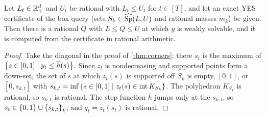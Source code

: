 \begin{proposition}\label{prop:rational-Q}
Let $L_t\in\Rp[d]$ and $U_t$ be rational with $L_t\le U_t$ for $t\in[T]$, and let an exact YES certificate of the box query (sets $S_k\in\wSp(L,U)$ and rational masses $m_k$) be given. Then there is a rational $Q$ with $L\le Q\le U$ at which $y$ is weakly solvable, and it is computed from the certificate in rational arithmetic.
\end{proposition}

\begin{proof}
Take the diagonal in the proof of \cref{thm:corners}; there $s_t$ is the maximum of $\set{s\in[0,1]\mid y_t\le\overline h(s)}$. Since $z_t$ is nondecreasing and supported points form a down-set, the set of $s$ at which $z_t(s)$ is supported off $S_k$ is empty, $[0,1]$, or $[0,s_{k,t}]$ with $s_{k,t}=\inf\set{s\in[0,1]\mid z_t(s)\in\interior K_{S_k}}$. The polyhedron $K_{S_k}$ is rational, so $s_{k,t}$ is rational. The step function $\overline h$ jumps only at the $s_{k,t}$, so $s_t\in\set{0,1}\cup\set{s_{k,t}}_k$, and $q_t=z_t(s_t)$ is rational.
\end{proof}
